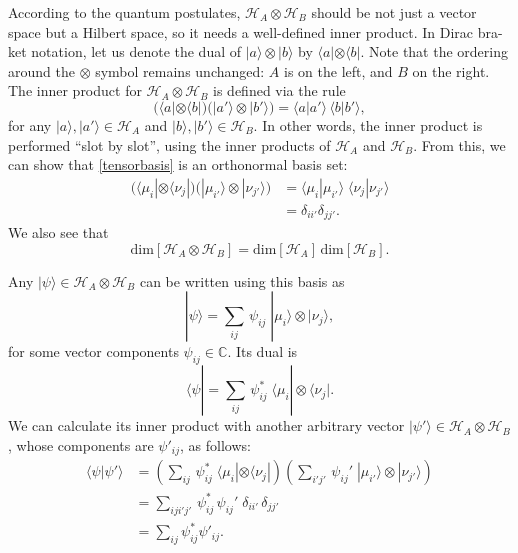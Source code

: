 \documentclass[pra,12pt]{revtex4}
\begin{document}
According to the quantum postulates, $\mathscr{H}_A\otimes
\mathscr{H}_B$ should be not just a vector space but a Hilbert space,
so it needs a well-defined inner product.  In Dirac bra-ket notation,
let us denote the dual of $|a\rangle\otimes|b\rangle$ by $\langle a|
\otimes \langle b|$.  Note that the ordering around the $\otimes$
symbol remains unchanged: $A$ is on the left, and $B$ on the right.
The inner product for $\mathscr{H}_A\otimes \mathscr{H}_B$ is defined
via the rule
\begin{equation}
  \Big(\langle a| \otimes \langle b| \Big)
  \Big(| a'\rangle \otimes |b'\rangle \Big) = \langle a|a'\rangle\,
  \langle b|b'\rangle,
  \label{innerprod}
\end{equation}
for any $|a\rangle, |a'\rangle \in \mathscr{H}_A$ and $|b\rangle,
|b'\rangle \in \mathscr{H}_B$.  In other words, the inner product is
performed ``slot by slot'', using the inner products of
$\mathscr{H}_A$ and $\mathscr{H}_B$.  From this, we can show that
\eqref{tensorbasis} is an orthonormal basis set:
\begin{align}
  \Big( \langle\mu_i| \otimes \langle\nu_j|\Big)
  \Big( |\mu_{i'}\rangle \otimes |\nu_{j'}\rangle\Big)
  &= \langle \mu_i|\mu_{i'}\rangle \;
  \langle \nu_j|\nu_{j'}\rangle \\
  &= \delta_{ii'}\delta_{jj'}.  
\end{align}
We also see that
\begin{equation}
  \mathrm{dim}\left[\mathscr{H}_A\otimes
  \mathscr{H}_B\right] = \mathrm{dim}\left[\mathscr{H}_A\right] \,
  \mathrm{dim}\left[\mathscr{H}_B\right].
  \label{tensordim}
\end{equation}

Any $|\psi\rangle \in \mathscr{H}_A\otimes \mathscr{H}_B$ can be
written using this basis as
\begin{equation}
  |\psi\rangle = \sum_{ij} \, \psi_{ij}\; |\mu_i\rangle \otimes |\nu_j\rangle,
  \label{psispan}
\end{equation}
for some vector components $\psi_{ij}\in\mathbb{C}$.  Its dual is
\begin{equation}
  \langle \psi| = \sum_{ij} \, \psi_{ij}^*\; \langle\mu_i| \otimes \langle\nu_j|.
\end{equation}
We can calculate its inner product with another arbitrary vector
$|\psi'\rangle \in \mathscr{H}_A \otimes \mathscr{H}_B$, whose
components are $\psi'_{ij}$, as follows:
\begin{align}
  \langle \psi| \psi'\rangle &=
  \left(\sum_{ij} \, \psi_{ij}^*\; \langle\mu_i| \otimes \langle\nu_j|\right)
  \left(\sum_{i'j'} \, \psi_{ij}'\; |\mu_{i'}\rangle \otimes |\nu_{j'}\rangle\right) \\
  &=\sum_{iji'j'} \, \psi_{ij}^*\, \psi_{ij}' \; \delta_{ii'} \, \delta_{jj'} \\
  &= \sum_{ij} \psi_{ij}^* \psi'_{ij}.
\end{align}
\end{document}
